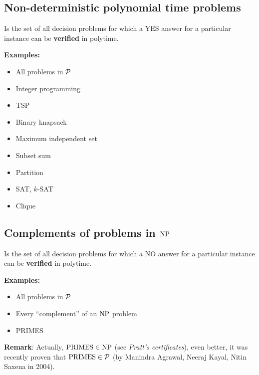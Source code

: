 \documentclass[../open-optimization/open-optimization.tex]{subfiles}
\begin{document}
	\subsection{Non-deterministic polynomial time problems}
	
	\begin{definition} 
Is the set of all decision problems for which a YES answer for a  
particular instance can be {\bf verified} in polytime.
\end{definition}
	
	{\bf Examples:}

\begin{multicols}{2}
\begin{itemize}
\item All problems in ${\mathcal{P}}$
\item Integer programming
\item TSP
\item Binary knapsack
\item Maximum independent set
\item Subset sum
\item Partition
\item SAT, $k$-SAT
\item Clique
\end{itemize}
\end{multicols}
	
	\subsection{Complements of problems in $\text{NP}$}
	\begin{definition} 
Is the set of all decision problems for which a NO answer for a  
particular instance can be {\bf verified} in polytime.
\end{definition}

	{\bf Examples:}

\begin{multicols}{2}
\begin{itemize}
\item All problems in ${\mathcal{P}}$
\item Every ``complement'' of an $\text{NP}$ problem
\item PRIMES
\end{itemize}
\end{multicols}

{\bf Remark}: Actually, $\textup{PRIMES}\in\text{NP}$ (see {\em Pratt's certificates}), even better, it was recently proven that $\textup{PRIMES}\in{\mathcal{P}}$ (by Manindra Agrawal, Neeraj Kayal, Nitin Saxena in 2004).
\end{document}
